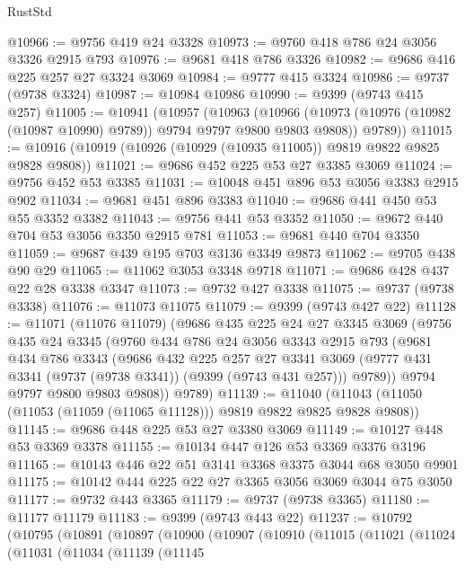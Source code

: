 \begin{lexlean}{RustStd}
\begin{coremodule}
@10966 := @9756 @419 @24 @3328
@10973 := @9760 @418 @786 @24 @3056 @3326 @2915 @793
@10976 := @9681 @418 @786 @3326
@10982 := @9686 @416 @225 @257 @27 @3324 @3069
@10984 := @9777 @415 @3324
@10986 := @9737 (@9738 @3324)
@10987 := @10984 @10986
@10990 := @9399 (@9743 @415 @257)
@11005 := @10941
    (@10957
      (@10963
        (@10966 (@10973 (@10976 (@10982 (@10987 @10990) @9789)) @9794 @9797 @9800 @9803 @9808))
        @9789))
@11015 := @10916 (@10919 (@10926 (@10929 (@10935 @11005)) @9819 @9822 @9825 @9828 @9808))
@11021 := @9686 @452 @225 @53 @27 @3385 @3069
@11024 := @9756 @452 @53 @3385
@11031 := @10048 @451 @896 @53 @3056 @3383 @2915 @902
@11034 := @9681 @451 @896 @3383
@11040 := @9686 @441 @450 @53 @55 @3352 @3382
@11043 := @9756 @441 @53 @3352
@11050 := @9672 @440 @704 @53 @3056 @3350 @2915 @781
@11053 := @9681 @440 @704 @3350
@11059 := @9687 @439 @195 @703 @3136 @3349 @9873
@11062 := @9705 @438 @90 @29
@11065 := @11062 @3053 @3348 @9718
@11071 := @9686 @428 @437 @22 @28 @3338 @3347
@11073 := @9732 @427 @3338
@11075 := @9737 (@9738 @3338)
@11076 := @11073 @11075
@11079 := @9399 (@9743 @427 @22)
@11128 := @11071
    (@11076 @11079)
    (@9686
      @435
      @225
      @24
      @27
      @3345
      @3069
      (@9756
        @435
        @24
        @3345
        (@9760
          @434
          @786
          @24
          @3056
          @3343
          @2915
          @793
          (@9681
            @434
            @786
            @3343
            (@9686
              @432
              @225
              @257
              @27
              @3341
              @3069
              (@9777 @431 @3341 (@9737 (@9738 @3341)) (@9399 (@9743 @431 @257)))
              @9789))
          @9794
          @9797
          @9800
          @9803
          @9808))
      @9789)
@11139 := @11040 (@11043 (@11050 (@11053 (@11059 (@11065 @11128))) @9819 @9822 @9825 @9828 @9808))
@11145 := @9686 @448 @225 @53 @27 @3380 @3069
@11149 := @10127 @448 @53 @3369 @3378
@11155 := @10134 @447 @126 @53 @3369 @3376 @3196
@11165 := @10143 @446 @22 @51 @3141 @3368 @3375 @3044 @68 @3050 @9901
@11175 := @10142 @444 @225 @22 @27 @3365 @3056 @3069 @3044 @75 @3050
@11177 := @9732 @443 @3365
@11179 := @9737 (@9738 @3365)
@11180 := @11177 @11179
@11183 := @9399 (@9743 @443 @22)
@11237 := @10792
    (@10795
      (@10891
        (@10897
          (@10900
            (@10907
              (@10910
                (@11015
                  (@11021
                    (@11024
                      (@11031
                        (@11034
                          (@11139
                            (@11145

\end{coremodule}
\end{lexlean}

